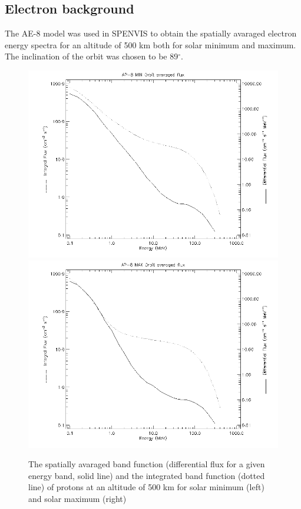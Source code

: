 \documentclass[12pt, a4paper,titlepage]{article}
\numberwithin{equation}{section}
\numberwithin{figure}{section}
\begin{document}
\subsection{Electron background}



The AE-8 model was used in SPENVIS to obtain the spatially avaraged electron energy spectra for an altitude of 500 km both for solar minimum and maximum. The inclination of the orbit was chosen to be 89$^{\circ}$. %

\begin{figure}[htbp]
 \centering %
 \includegraphics[width=.45\textwidth,origin=c,angle=0]{images/alt_500km_AP-8_MIN_averaged_spectra.png}
 \qquad
 \includegraphics[width=.45\textwidth,origin=c]{images/alt_500km_AP-8_MAX_averaged_spectra.png} 
 \caption{\label{fig:electrs} The spatially avaraged band function (differential flux for a given energy band, solid line) and the integrated band function (dotted line) of protons at an altitude of 500 km for solar minimum (left) and solar maximum (right) }
 \end{figure}
\end{document}
